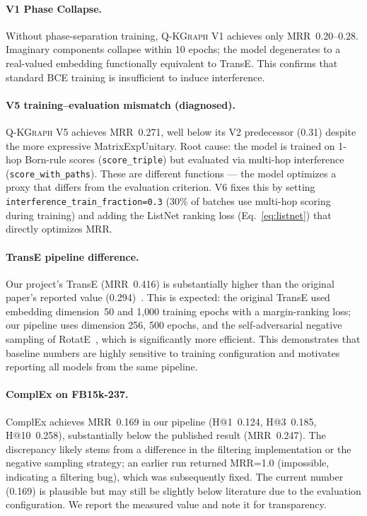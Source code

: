 \documentclass[runningheads]{llncs}
\newcommand{\QR}{\textsc{Q-KGraph}}
\begin{document}
\paragraph{V1 Phase Collapse.}
Without phase-separation training, \QR{} V1 achieves only MRR~0.20--0.28.
Imaginary components collapse within 10 epochs; the model degenerates to a
real-valued embedding functionally equivalent to TransE.  This confirms that
standard BCE training is insufficient to induce interference.

\paragraph{V5 training--evaluation mismatch (diagnosed).}
\QR{} V5 achieves MRR~0.271, well below its V2 predecessor (0.31) despite
the more expressive MatrixExpUnitary.  Root cause: the model is trained
on 1-hop Born-rule scores (\texttt{score\_triple}) but evaluated via
multi-hop interference (\texttt{score\_with\_paths}).  These are different
functions --- the model optimizes a proxy that differs from the evaluation
criterion.  V6 fixes this by setting
\texttt{interference\_train\_fraction=0.3} (30\% of batches use multi-hop
scoring during training) and adding the ListNet ranking loss
(Eq.~\ref{eq:listnet}) that directly optimizes MRR.

\paragraph{TransE pipeline difference.}
Our project's TransE (MRR~0.416) is substantially higher than the original
paper's reported value (0.294)~\cite{ref_transe}.  This is expected: the
original TransE used embedding dimension~50 and 1{,}000 training epochs with
a margin-ranking loss; our pipeline uses dimension 256, 500 epochs, and the
self-adversarial negative sampling of RotatE~\cite{ref_rotate}, which is
significantly more efficient.  This demonstrates that baseline numbers are
highly sensitive to training configuration and motivates reporting all models
from the same pipeline.

\paragraph{ComplEx on FB15k-237.}
ComplEx achieves MRR~0.169 in our pipeline (H@1~0.124, H@3~0.185,
H@10~0.258), substantially below the published result (MRR~0.247).  The
discrepancy likely stems from a difference in the filtering implementation or
the negative sampling strategy; an earlier run returned MRR=1.0 (impossible,
indicating a filtering bug), which was subsequently fixed.  The current
number (0.169) is plausible but may still be slightly below literature due to
the evaluation configuration.  We report the measured value and note it for
transparency.
\end{document}
